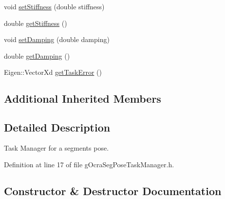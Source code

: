 \begin{DoxyCompactItemize}
void \hyperlink{classgocra_1_1gOcraSegPoseTaskManager_aee63dd2df0da89a98c844245abd87297}{set\+Stiffness} (double stiffness)
\item 
double \hyperlink{classgocra_1_1gOcraSegPoseTaskManager_a1fabad2f6aef0f4e3088225ba71555a5}{get\+Stiffness} ()
\item 
void \hyperlink{classgocra_1_1gOcraSegPoseTaskManager_af1c9cd4b30f956ef607c19a7756c71f9}{set\+Damping} (double damping)
\item 
double \hyperlink{classgocra_1_1gOcraSegPoseTaskManager_af8a42a3b2f546377095c6c7a5849ef58}{get\+Damping} ()
\item 
Eigen\+::\+Vector\+Xd \hyperlink{classgocra_1_1gOcraSegPoseTaskManager_a059b69af0a960110bb14863f0179b1cd}{get\+Task\+Error} ()
\end{DoxyCompactItemize}
\subsection*{Additional Inherited Members}


\subsection{Detailed Description}
Task Manager for a segment\textquotesingle{}s pose. 



Definition at line 17 of file g\+Ocra\+Seg\+Pose\+Task\+Manager.\+h.



\subsection{Constructor \& Destructor Documentation}
\hypertarget{classgocra_1_1gOcraSegPoseTaskManager_a9756a704f7ac1b45084ed1aa44ffc805}{}\label{classgocra_1_1gOcraSegPoseTaskManager_a9756a704f7ac1b45084ed1aa44ffc805} 

